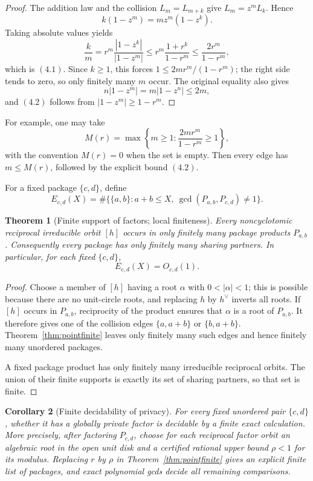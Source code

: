 \documentclass[11pt]{article}
\newtheorem{theorem}{Theorem}[section]
\newtheorem{corollary}[theorem]{Corollary}
\theoremstyle{definition}
\begin{document}
\begin{proof}
The addition law and the collision \(L_m=L_{m+k}\) give
\(L_m=z^mL_k\).  Hence
\[
 k(1-z^m)=mz^m(1-z^k).
\]
Taking absolute values yields
\[
 \frac{k}{m}
 =r^m\frac{|1-z^k|}{|1-z^m|}
 \leq r^m\frac{1+r^k}{1-r^m}
 \leq\frac{2r^m}{1-r^m},
\]
which is \((4.1)\).  Since \(k\geq1\), this forces
\(1\leq2mr^m/(1-r^m)\); the right side tends to zero, so only finitely
many \(m\) occur.  The original equality also gives
\[
 n|1-z^m|=m|1-z^n|\leq2m,
\]
and \((4.2)\) follows from \(|1-z^m|\geq1-r^m\).
\end{proof}

For example, one may take
\[
 M(r)=\max\left\{m\geq1:\frac{2mr^m}{1-r^m}\geq1\right\},
\]
with the convention \(M(r)=0\) when the set is empty.  Then every edge has
\(m\leq M(r)\), followed by the explicit bound \((4.2)\).

For a fixed package \(\{c,d\}\), define
\[
 E_{c,d}(X)=\#\bigl\{\{a,b\}:a+b\leq X,
 \ \gcd(P_{a,b},P_{c,d})\neq1\bigr\}.
\]

\begin{theorem}[Finite support of factors; local finiteness]
\label{thm:localfinite}
Every noncyclotomic reciprocal irreducible orbit \([h]\) occurs in only
finitely many package products \(P_{a,b}\).  Consequently every package has
only finitely many sharing partners.  In particular, for each fixed
\(\{c,d\}\),
\[
 E_{c,d}(X)=O_{c,d}(1).
\]
\end{theorem}

\begin{proof}
Choose a member of \([h]\) having a root \(\alpha\) with
\(0<|\alpha|<1\); this is possible because there are no unit-circle roots,
and replacing \(h\) by \(h^\vee\) inverts all roots.  If \([h]\) occurs
in \(P_{a,b}\), reciprocity of the product ensures that \(\alpha\) is a
root of \(P_{a,b}\).  It therefore gives one of the collision edges
\(\{a,a+b\}\) or \(\{b,a+b\}\).  Theorem~\ref{thm:pointfinite} leaves
only finitely many such edges and hence finitely many unordered packages.

A fixed package product has only finitely many irreducible reciprocal orbits.
The union of their finite supports is exactly its set of sharing partners, so
that set is finite.
\end{proof}

\begin{corollary}[Finite decidability of privacy]
\label{cor:privacydecidable}
For every fixed unordered pair \(\{c,d\}\), whether it has a globally
private factor is decidable by a finite exact calculation.  More precisely,
after factoring \(P_{c,d}\), choose for each reciprocal factor orbit an
algebraic root in the open unit disk and a certified rational upper bound
\(\rho<1\) for its modulus.  Replacing \(r\) by \(\rho\) in
Theorem~\ref{thm:pointfinite} gives an explicit finite list of packages, and
exact polynomial gcds decide all remaining comparisons.
\end{corollary}
\end{document}
